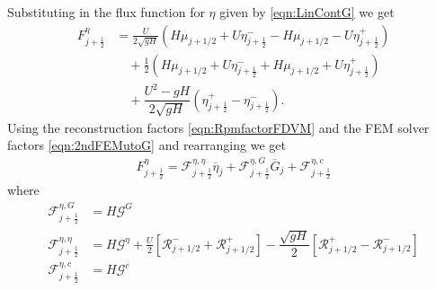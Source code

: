 Substituting in the flux function for $\eta$ given by \eqref{eqn:LinContG} we get
\begin{align*}
F^\eta_{j+\frac{1}{2}} &= \frac{U}{2 \sqrt{gH}} \left( H\mu_{j+1/2} + U\eta^-_{j+\frac{1}{2}} -  H\mu_{j+1/2} - U \eta^+_{j+\frac{1}{2}} \right)   \nonumber \\ & \quad + \frac{1}{2}\left(H\mu_{j+1/2} + U\eta^-_{j+\frac{1}{2}} +  H\mu_{j+1/2} + U \eta^+_{j+\frac{1}{2}}\right) \nonumber \\ &\quad + \dfrac{U^2 - gH}{2\sqrt{g H}} \left (\eta^+_{j+\frac{1}{2}} - \eta^-_{j+\frac{1}{2}} \right).
\end{align*}
Using the reconstruction factors \eqref{eqn:RpmfactorFDVM} and the FEM solver factors \eqref{eqn:2ndFEMutoG} and rearranging we get
	\begin{align*}
	F^\eta_{j+\frac{1}{2}} = \mathcal{F}^{\eta, \eta}_{j+\frac{1}{2}} \overline{\eta}_{j} + \mathcal{F}^{\eta, G}_{j+\frac{1}{2}} \overline{G}_{j} + \mathcal{F}^{\eta, c}_{j+\frac{1}{2}}
	\end{align*}
	where
	\begin{align*}
	\mathcal{F}^{\eta, G}_{j+\frac{1}{2}} &=  H \mathcal{G}^G\\
	\mathcal{F}^{\eta, \eta}_{j+\frac{1}{2}} &=  H\mathcal{G}^{\eta}  + \frac{U}{2}\left[ \mathcal{R}^-_{j+1/2} +  \mathcal{R}^+_{j+1/2}\right]- \dfrac{\sqrt{gH}}{2} \left [ \mathcal{R}^+_{j+1/2} - \mathcal{R}^-_{j+1/2} \right ]\\
	\mathcal{F}^{\eta, c}_{j+\frac{1}{2}} &=  H\mathcal{G}^c
	\end{align*}

